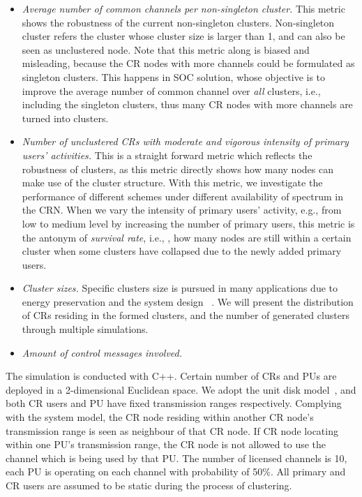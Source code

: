 \documentclass[10pt,journal,compsoc]{IEEEtran}
\theoremstyle{mytheoremstyle}
\theoremstyle{mytheoremstyle}
\theoremstyle{mytheoremstyle}
\newcommand{\eg}{e.g., }
\newcommand{\ie}{i.e., }
\begin{document}
\begin{itemize}
\item \textit{Average number of common channels per non-singleton cluster.} 
This metric shows the robustness of the current non-singleton clusters.
Non-singleton cluster refers the cluster whose cluster size is larger than 1, and can also be seen as unclustered node.
Note that this metric along is biased and misleading, because the CR nodes with more channels could be formulated as singleton clusters.
This happens in SOC solution, whose objective is to improve the average number of common channel over \textit{all} clusters, \ie including the singleton clusters, thus many CR nodes with more channels are turned into clusters.


\item \textit{Number of unclustered CRs with moderate and vigorous intensity of primary users' activities.}
This is a straight forward metric which reflects the robustness of clusters, as this metric directly shows how many nodes can make use of the cluster structure.
With this metric, we investigate the performance of different schemes under different availability of spectrum in the CRN.
When we vary the intensity of primary users' activity, \eg from low to medium level by increasing the number of primary users, this metric is the antonym of \textit{survival rate}, \ie, how many nodes are still within a certain cluster when some clusters have collapsed due to the newly added primary users.


\item \textit{Cluster sizes.}
Specific clusters size is pursued in many applications due to energy preservation and the system design ~\cite{clustering_globecom11}.
We will present the distribution of CRs residing in the formed clusters, and the number of generated clusters through multiple simulations.

\item \textit{Amount of control messages involved.}

\end{itemize}

The simulation is conducted with C++. 
Certain number of CRs and PUs are deployed in a 2-dimensional Euclidean space.
We adopt the unit disk model~\cite{unitDiskModel}, and both CR users and PU have fixed transmission ranges respectively.
Complying with the system model, the CR node residing within another CR node's transmission range is seen as neighbour of that CR node.
If CR node locating within one PU's transmission range, the CR node is not allowed to use the channel which is being used by that PU.
The number of licensed channels is 10, each PU is operating on each channel with probability of 50\%.
All primary and CR users are assumed to be static during the process of clustering.
\end{document}
